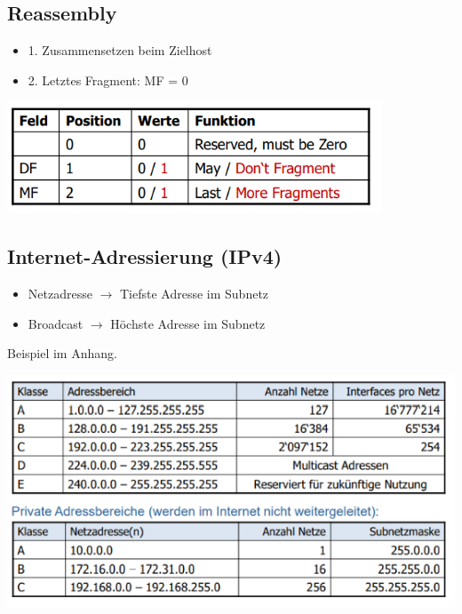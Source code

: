 \subsection{Reassembly}{
    \begin{itemize}[noitemsep]
        \item 1. Zusammensetzen beim Zielhost
        \item 2. Letztes Fragment: MF = 0
    \end{itemize}}
\includegraphics[scale=0.5]{img/fragment.png}

\subsection{Internet-Adressierung (IPv4)}{
    \begin{itemize}[noitemsep]
        \item Netzadresse $\to$ Tiefste Adresse im Subnetz
        \item Broadcast $\to$ Höchste Adresse im Subnetz
    \end{itemize}

    Beispiel im Anhang.

    \includegraphics[scale=0.425]{img/netztklassen.png}


}
